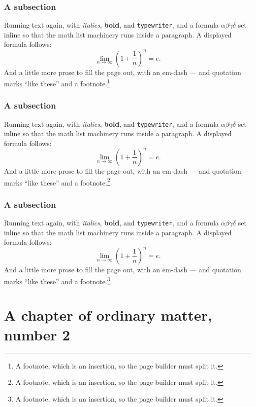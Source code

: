 \documentclass[11pt,a4paper]{report}
\theoremstyle{plain}
\begin{document}
\subsection{A subsection}
Running text again, with \textit{italics}, \textbf{bold}, and
\texttt{typewriter}, and a formula $\alpha\beta\gamma\delta$ set inline so
that the math list machinery runs inside a paragraph. A displayed formula
follows:
\[ \lim_{n\to\infty}\left(1+\frac{1}{n}\right)^{n}=e . \]
And a little more prose to fill the page out, with an em-dash --- and
quotation marks ``like these'' and a footnote.\footnote{A footnote, which is
an insertion, so the page builder must split it.}
\subsection{A subsection}
Running text again, with \textit{italics}, \textbf{bold}, and
\texttt{typewriter}, and a formula $\alpha\beta\gamma\delta$ set inline so
that the math list machinery runs inside a paragraph. A displayed formula
follows:
\[ \lim_{n\to\infty}\left(1+\frac{1}{n}\right)^{n}=e . \]
And a little more prose to fill the page out, with an em-dash --- and
quotation marks ``like these'' and a footnote.\footnote{A footnote, which is
an insertion, so the page builder must split it.}
\subsection{A subsection}
Running text again, with \textit{italics}, \textbf{bold}, and
\texttt{typewriter}, and a formula $\alpha\beta\gamma\delta$ set inline so
that the math list machinery runs inside a paragraph. A displayed formula
follows:
\[ \lim_{n\to\infty}\left(1+\frac{1}{n}\right)^{n}=e . \]
And a little more prose to fill the page out, with an em-dash --- and
quotation marks ``like these'' and a footnote.\footnote{A footnote, which is
an insertion, so the page builder must split it.}
\chapter{A chapter of ordinary matter, number 2}
\end{document}
